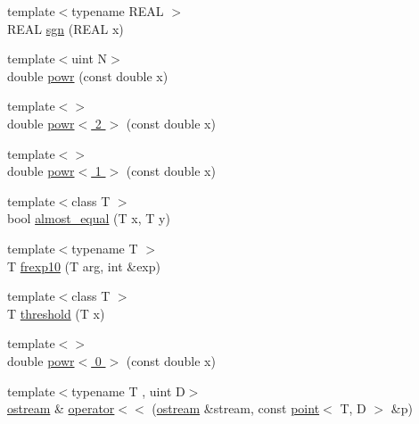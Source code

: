 \begin{DoxyCompactItemize}
\item 
{\footnotesize template$<$typename R\+E\+AL $>$ }\\R\+E\+AL \hyperlink{namespacemui_ae7aea58ed7f2fe057ff92210390e1adf}{sgn} (R\+E\+AL x)
\item 
{\footnotesize template$<$uint N$>$ }\\double \hyperlink{namespacemui_ab915ac09900cc1e6986f3f054363016c}{powr} (const double x)
\item 
{\footnotesize template$<$$>$ }\\double \hyperlink{namespacemui_a5f1a0ebdb048dd8821acf0f391d036e6}{powr$<$ 2 $>$} (const double x)
\item 
{\footnotesize template$<$$>$ }\\double \hyperlink{namespacemui_a5841c790c9b498447903fa429451ee4d}{powr$<$ 1 $>$} (const double x)
\item 
{\footnotesize template$<$class T $>$ }\\bool \hyperlink{namespacemui_a2e00c62074bb5b841ee769fdaca679a0}{almost\+\_\+equal} (T x, T y)
\item 
{\footnotesize template$<$typename T $>$ }\\T \hyperlink{namespacemui_a300c1ee6082d9a5ce567f3d48223cf59}{frexp10} (T arg, int \&exp)
\item 
{\footnotesize template$<$class T $>$ }\\T \hyperlink{namespacemui_a4d85cef0ffefcf38c4eb3cf62eb2efa2}{threshold} (T x)
\item 
{\footnotesize template$<$$>$ }\\double \hyperlink{namespacemui_a0d4458e7402b6889e19947f35f781c1c}{powr$<$ 0 $>$} (const double x)
\item 
{\footnotesize template$<$typename T , uint D$>$ }\\\hyperlink{classmui_1_1ostream}{ostream} \& \hyperlink{namespacemui_a47ea1ee49c3674c72687a5c40786d3e0}{operator$<$$<$} (\hyperlink{classmui_1_1ostream}{ostream} \&stream, const \hyperlink{structmui_1_1point}{point}$<$ T, D $>$ \&p)
\begin{DoxyCompactList}\small\item\em 


\end{DoxyCompactList}
\end{DoxyCompactItemize}
